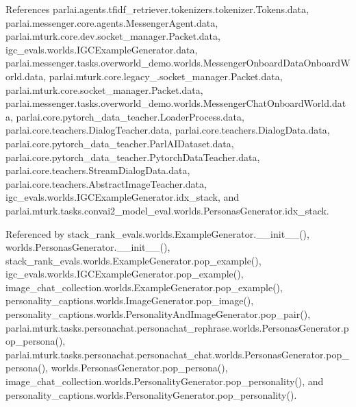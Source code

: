 References parlai.\+agents.\+tfidf\+\_\+retriever.\+tokenizers.\+tokenizer.\+Tokens.\+data, parlai.\+messenger.\+core.\+agents.\+Messenger\+Agent.\+data, parlai.\+mturk.\+core.\+dev.\+socket\+\_\+manager.\+Packet.\+data, igc\+\_\+evals.\+worlds.\+I\+G\+C\+Example\+Generator.\+data, parlai.\+messenger.\+tasks.\+overworld\+\_\+demo.\+worlds.\+Messenger\+Onboard\+Data\+Onboard\+World.\+data, parlai.\+mturk.\+core.\+legacy\+\_.\+socket\+\_\+manager.\+Packet.\+data, parlai.\+mturk.\+core.\+socket\+\_\+manager.\+Packet.\+data, parlai.\+messenger.\+tasks.\+overworld\+\_\+demo.\+worlds.\+Messenger\+Chat\+Onboard\+World.\+data, parlai.\+core.\+pytorch\+\_\+data\+\_\+teacher.\+Loader\+Process.\+data, parlai.\+core.\+teachers.\+Dialog\+Teacher.\+data, parlai.\+core.\+teachers.\+Dialog\+Data.\+data, parlai.\+core.\+pytorch\+\_\+data\+\_\+teacher.\+Parl\+A\+I\+Dataset.\+data, parlai.\+core.\+pytorch\+\_\+data\+\_\+teacher.\+Pytorch\+Data\+Teacher.\+data, parlai.\+core.\+teachers.\+Stream\+Dialog\+Data.\+data, parlai.\+core.\+teachers.\+Abstract\+Image\+Teacher.\+data, igc\+\_\+evals.\+worlds.\+I\+G\+C\+Example\+Generator.\+idx\+\_\+stack, and parlai.\+mturk.\+tasks.\+convai2\+\_\+model\+\_\+eval.\+worlds.\+Personas\+Generator.\+idx\+\_\+stack.



Referenced by stack\+\_\+rank\+\_\+evals.\+worlds.\+Example\+Generator.\+\_\+\+\_\+init\+\_\+\+\_\+(), worlds.\+Personas\+Generator.\+\_\+\+\_\+init\+\_\+\+\_\+(), stack\+\_\+rank\+\_\+evals.\+worlds.\+Example\+Generator.\+pop\+\_\+example(), igc\+\_\+evals.\+worlds.\+I\+G\+C\+Example\+Generator.\+pop\+\_\+example(), image\+\_\+chat\+\_\+collection.\+worlds.\+Example\+Generator.\+pop\+\_\+example(), personality\+\_\+captions.\+worlds.\+Image\+Generator.\+pop\+\_\+image(), personality\+\_\+captions.\+worlds.\+Personality\+And\+Image\+Generator.\+pop\+\_\+pair(), parlai.\+mturk.\+tasks.\+personachat.\+personachat\+\_\+rephrase.\+worlds.\+Personas\+Generator.\+pop\+\_\+persona(), parlai.\+mturk.\+tasks.\+personachat.\+personachat\+\_\+chat.\+worlds.\+Personas\+Generator.\+pop\+\_\+persona(), worlds.\+Personas\+Generator.\+pop\+\_\+persona(), image\+\_\+chat\+\_\+collection.\+worlds.\+Personality\+Generator.\+pop\+\_\+personality(), and personality\+\_\+captions.\+worlds.\+Personality\+Generator.\+pop\+\_\+personality().

